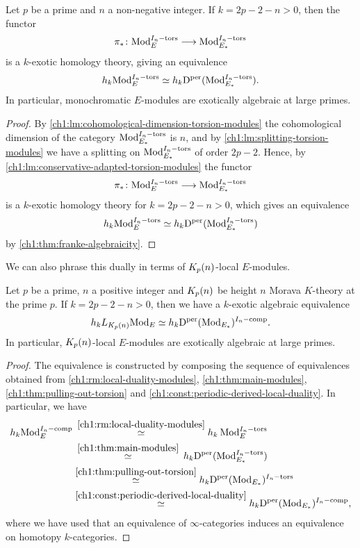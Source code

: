 \begin{theorem}
    \label{ch1:thm:main-modules}
    Let $p$ be a prime and $n$ a non-negative integer. If $k=2p-2-n>0$, then the functor 
    \[\pi_*\colon \mathrm{Mod}_{E}^{I_n-\mathrm{tors}}\longrightarrow\mathrm{Mod}_{E_*}^{I_n-\mathrm{tors}}\]
    is a $k$-exotic homology theory, giving an equivalence 
    \[h_k \mathrm{Mod}_{E}^{I_n-\mathrm{tors}} \simeq h_k \mathrm{D}^{\mathrm{per}}(\mathrm{Mod}_{E_*}^{I_n-\mathrm{tors}}).\]
    In particular, monochromatic $E$-modules are exotically algebraic at large primes. 
\end{theorem}
\begin{proof}
    By \cref{ch1:lm:cohomological-dimension-torsion-modules} the cohomological dimension of the category $\mathrm{Mod}_{E_*}^{I_n-\mathrm{tors}}$ is $n$, and by \cref{ch1:lm:splitting-torsion-modules} we have a splitting on $\mathrm{Mod}_{E_*}^{I_n-\mathrm{tors}}$ of order $2p-2$. Hence, by \cref{ch1:lm:conservative-adapted-torsion-modules} the functor $$\pi_*\colon \mathrm{Mod}_{E}^{I_n-\mathrm{tors}} \longrightarrow \mathrm{Mod}_{E_*}^{I_n-\mathrm{tors}}$$
    is a $k$-exotic homology theory for $k=2p-2-n>0$, which gives an equivalence 
    \[h_k \mathrm{Mod}_{E}^{I_n-\mathrm{tors}} \simeq h_k \mathrm{D}^{\mathrm{per}}(\mathrm{Mod}_{E_*}^{I_n-\mathrm{tors}})\]
    by \cref{ch1:thm:franke-algebraicity}.
\end{proof}

We can also phrase this dually in terms of ${K_p(n)}$-local $E$-modules. 

\begin{corollary}
    \label{ch1:cor:main-modules-dual}
    Let $p$ be a prime, $n$ a positive integer and ${K_p(n)}$ be height $n$ Morava $K$-theory at the prime $p$. If $k=2p-2-n>0$, then we have a $k$-exotic algebraic equivalence 
    \[h_k L_{{K_p(n)}}\mathrm{Mod}_{E} \simeq h_k \mathrm{D}^{\mathrm{per}}(\mathrm{Mod}_{E_*})^{I_n-\mathrm{comp}}.\]
    In particular, ${K_p(n)}$-local $E$-modules are exotically algebraic at large primes. 
\end{corollary}
\begin{proof}
    The equivalence is constructed by composing the sequence of equivalences obtained from \cref{ch1:rm:local-duality-modules}, \cref{ch1:thm:main-modules}, \cref{ch1:thm:pulling-out-torsion} and \cref{ch1:const:periodic-derived-local-duality}. In particular, we have
    \begin{align*}
        h_k \mathrm{Mod}_{E}^{I_n-\mathrm{comp}}
        &\hspace{2pt}\overset{\ref{ch1:rm:local-duality-modules}}\simeq 
        h_k \hspace{2pt} \mathrm{Mod}_{E}^{I_n-\mathrm{tors}} \\
        &\hspace{2pt}\overset{\ref{ch1:thm:main-modules}}\simeq 
        \hspace{2pt} h_k \mathrm{D}^{\mathrm{per}}(\mathrm{Mod}_{E_*}^{I_n-\mathrm{tors}}) \\
        &\overset{\ref{ch1:thm:pulling-out-torsion}}\simeq
        h_k \mathrm{D}^{\mathrm{per}}(\mathrm{Mod}_{E_*})^{I_n-\mathrm{tors}} \\
        &\overset{\ref{ch1:const:periodic-derived-local-duality}}\simeq 
        h_k \mathrm{D}^{\mathrm{per}}(\mathrm{Mod}_{E_*})^{I_n-\mathrm{comp}},
    \end{align*}
    where we have used that an equivalence of $\infty$-categories induces an equivalence on homotopy $k$-categories.
\end{proof}

